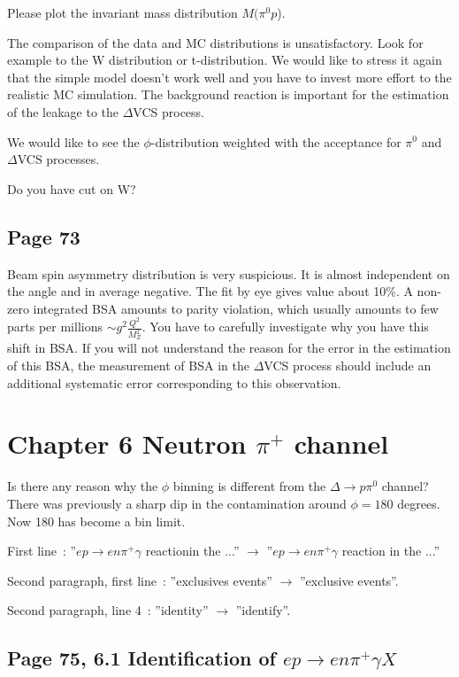 \documentclass[11pt]{paper}
\begin{document}
Please plot the invariant mass distribution $M(\pi^0p$).

The comparison of the data and MC distributions is unsatisfactory. Look for example to the W distribution
or t-distribution. We would like to stress it again that the simple model doesn't work well and you
have to invest more effort to the realistic MC simulation. 
The background reaction is important for the estimation of the leakage to the $\Delta$VCS process.

We would like to see the $\phi$-distribution weighted with the acceptance for
$\pi^0$ and $\Delta$VCS processes. 

Do you have cut on W? 

\subsection*{Page 73}

Beam spin asymmetry distribution is very suspicious. It is almost independent on the angle
and in average negative. The fit by eye gives value about 10\%. 
A non-zero integrated BSA amounts to parity violation, which usually amounts to few parts per millions $\sim g^2\frac{Q^2}{M_Z^2}$.
You have to carefully investigate why you have this shift in BSA. 
If you will not understand the reason for the error in the estimation of this BSA, 
the measurement of BSA in the $\Delta$VCS process should include an additional systematic error corresponding to this observation.

\section*{Chapter 6 Neutron $\pi^+$ channel}

Is there any reason why the $\phi$ binning is different from the $\Delta\rightarrow p\pi^0$ channel?
There was previously a sharp dip in the contamination around $\phi=180$ degrees.
Now 180 has become a bin limit.

First line~: ''$ep\rightarrow en\pi^+\gamma$ reactionin the ...'' $\rightarrow$ ''$ep\rightarrow en\pi^+\gamma$ reaction in the ...''

Second paragraph, first line~: ''exclusives events'' $\rightarrow$ ''exclusive events''.

Second paragraph, line 4~: ''identity'' $\rightarrow$ ''identify''.
 
\subsection*{Page 75, 6.1 Identification of $ep\rightarrow en\pi^+\gamma X$}
 
\end{document}
